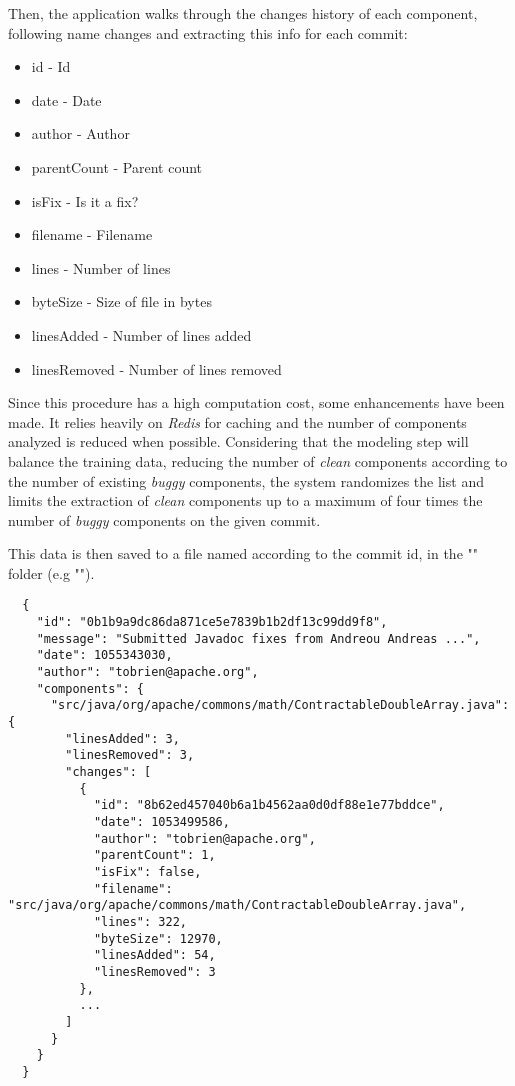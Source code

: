 Then, the application walks through the changes history of each component, following name changes and extracting this info for each commit:
%
\begin{itemize}
\item id - Id
\item date - Date
\item author - Author
\item parentCount - Parent count
\item isFix - Is it a fix?
\item filename - Filename
\item lines - Number of lines
\item byteSize - Size of file in bytes
\item linesAdded - Number of lines added
\item linesRemoved - Number of lines removed
\end{itemize}

Since this procedure has a high computation cost, some enhancements have been made. It relies heavily on \emph{Redis} for caching 
and the number of components analyzed is reduced when possible. Considering that the modeling step will balance the training data, 
reducing the number of \emph{clean} components according to the number of existing \emph{buggy} components, the system randomizes the list and
limits the extraction of \emph{clean} components up to a maximum of four times the number of \emph{buggy} components on the given commit.



This data is then saved to a file named according to the commit id, in the "" folder (e.g "").

\begin{lstlisting}
  {
    "id": "0b1b9a9dc86da871ce5e7839b1b2df13c99dd9f8",
    "message": "Submitted Javadoc fixes from Andreou Andreas ...",
    "date": 1055343030,
    "author": "tobrien@apache.org",
    "components": {
      "src/java/org/apache/commons/math/ContractableDoubleArray.java": {
        "linesAdded": 3,
        "linesRemoved": 3,
        "changes": [
          {
            "id": "8b62ed457040b6a1b4562aa0d0df88e1e77bddce",
            "date": 1053499586,
            "author": "tobrien@apache.org",
            "parentCount": 1,
            "isFix": false,
            "filename": "src/java/org/apache/commons/math/ContractableDoubleArray.java",
            "lines": 322,
            "byteSize": 12970,
            "linesAdded": 54,
            "linesRemoved": 3
          },
          ...
        ]
      }
    }
  }
\end{lstlisting}

